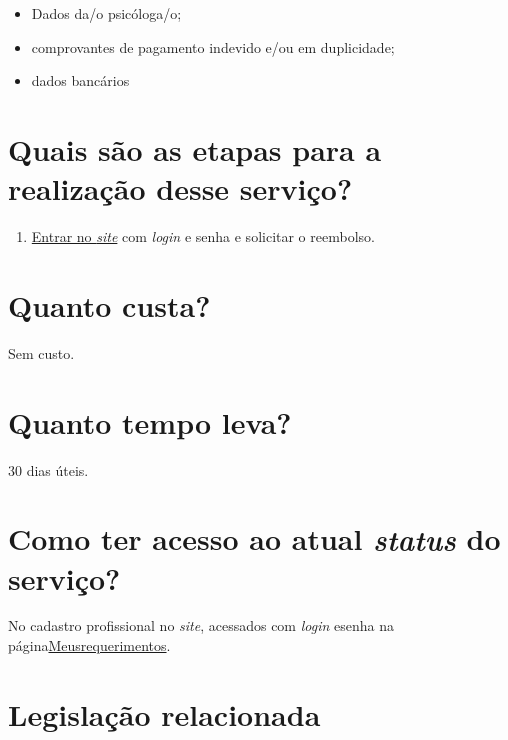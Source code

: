 \begin{itemize}
  \item  Dados da/o psicóloga/o;
  \item  comprovantes de pagamento indevido e/ou em duplicidade;
  \item  dados bancários
\end{itemize}

\section{Quais são as etapas para a realização desse serviço?}

\begin{enumerate}
  \item  \href{https://cfpsp.brctotal.com/crp06_servicosonline/pgsRequerimento/SelecionaRequerimento.aspx}{Entrar  no \emph{site}} com \emph{login} e senha e solicitar o reembolso.
\end{enumerate}

\section{Quanto custa?}

Sem custo.

\section{Quanto tempo leva?}

30 dias úteis.

\section{Como ter acesso ao atual \emph{status} do serviço?}

No cadastro profissional no \emph{site}, acessados com \emph{login} esenha na página\href{https://cfpsp.brctotal.com/crp06_servicosonline/pgsRequerimento/Requerimentos.aspx}{Meusrequerimentos}.

\section{Legislação relacionada}

